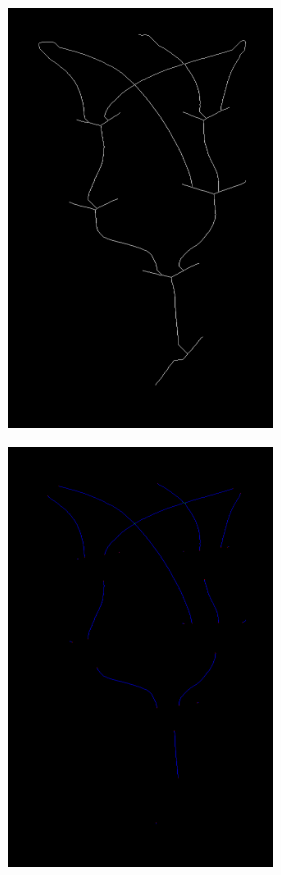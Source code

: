 \documentclass[makeidx, a4paper, 14pt]{extarticle}
\begin{document}
\begin{figure}[H]
    \includegraphics[width=70mm]{handwritten_1_image_skelet.png}
\end{figure}

\begin{figure}[H]
    \centering
    \includegraphics[width=70mm]{handwritten_1_classified_pixels.png}
\end{figure}
\end{document}
